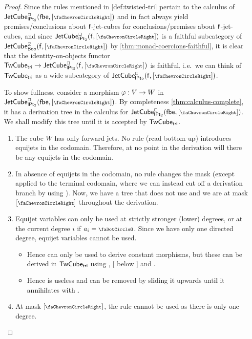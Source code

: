 \documentclass[a4paper]{memoir}
\begin{document}
\begin{proof}
	Since the rules mentioned in \cref{def:twisted-tri} pertain to the calculus of $\jetcubetri \affine \bipointedsym {[\ypolar]}$ and in fact always yield premises/conclusions about ${\mathsf{f}}$-jet-cubes for conclusions/premises about ${\mathsf{f}}$-jet-cubes, and since $\jetcubefwd \affine \bipointedsym {[\ypolar]}$ is a faithful subcategory of $\jetcubefwd \cartes \booleanalg {[\ypolar]}$ by \cref{thm:monad-coercions-faithful}, it is clear that the identity-on-objects functor $\twistedcubetri \to \jetcubefwd \affine \bipointedsym {[\ypolar]}$ is faithful, i.e.\ we can think of ${\mathsf{TwCube}}_{\mathsf{tri}}$ as a wide subcategory of $\jetcubefwd \affine \bipointedsym {[\ypolar]}$.
	
	To show fullness, consider a morphism $\varphi : V \to W$ in $\jetcubetri \affine \bipointedsym {[\ypolar]}$.
	By completeness \cref{thm:calculus-complete}, it has a derivation tree in the calculus for $\jetcubetri \affine \bipointedsym {[\ypolar]}$.
	We shall modify this tree until it is accepted by ${\mathsf{TwCube}}_{\mathsf{tri}}$.
	\begin{enumerate}
		\item The cube $W$ has only forward jets. No rule (read bottom-up) introduces equijets in the codomain. Therefore, at no point in the derivation will there be any equijets in the codomain.
		\item In absence of equijets in the codomain, no rule changes the mask (except  applied to the terminal codomain, where we can instead cut off a derivation branch by using ). Now, we have a tree that does not use  and we are at mask $[\ypolar]$ throughout the derivation.
		\item Equijet variables can only be used at strictly stronger (lower) degrees, or at the current degree $i$ if $a_i = \npolar$. Since we have only one directed degree, equijet variables cannot be used.
		\begin{itemize}
			\item Hence  can only be used to derive constant morphisms, but these can be derived in ${\mathsf{TwCube}}_{\mathsf{tri}}$ using , [ below ] and .
			\item Hence  is useless and can be removed by sliding it upwards until it annihilates with .
		\end{itemize} 
		\item At mask $[\ypolar]$, the rule  cannot be used as there is only one degree.

\end{enumerate}
\end{proof}
\end{document}
